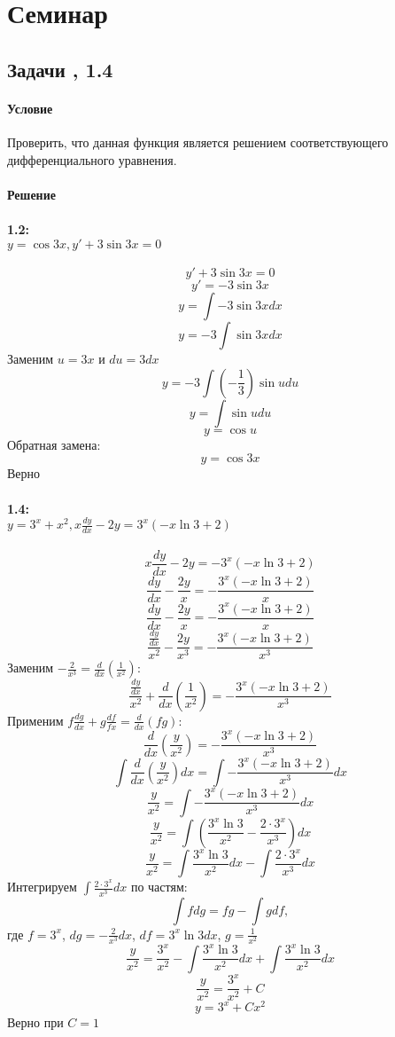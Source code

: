 \section{Семинар}
\subsection{Задачи , 1.4}
\paragraph{Условие}
Проверить, что данная функция является решением соответствующего дифференциального уравнения.
\paragraph{Решение}
\paragraph{1.2:\\ $y = \cos{3x}, y' + 3 \sin{3x} = 0$}
\[y' + 3 \sin{3x} = 0\]
\[y' = -3 \sin{3x}\]
\[y = \int -3 \sin{3x} dx\]
\[y = -3 \int \sin{3x} dx\]
Заменим $u = 3x$ и $du = 3dx$
\[y = -3 \int (-\frac{1}{3}) \sin{u} du\]
\[y = \int \sin{u} du\]
\[y = \cos{u}\]
Обратная замена:
\[y = \cos{3x}\]
Верно

\paragraph{1.4:\\ $y = 3^x + x^2, x\frac{dy}{dx} - 2y = 3^x(-x \ln 3 + 2)$}
\[x\frac{dy}{dx} - 2y = - 3^x(-x \ln 3 + 2)\]
\[\frac{dy}{dx} - \frac{2y}{x} = - \frac{3^x(-x \ln 3 + 2)}{x}\]
\[\frac{dy}{dx} - \frac{2y}{x} = - \frac{3^x(-x \ln 3 + 2)}{x}\]
\[\frac{\frac{dy}{dx}}{x^2} - \frac{2y}{x^3} = - \frac{3^x(-x \ln 3 + 2)}{x^3}\]
Заменим $-\frac{2}{x^3} = \frac{d}{dx} \left( \frac{1}{x^2} \right)$:
\[\frac{\frac{dy}{dx}}{x^2} + \frac{d}{dx} \left( \frac{1}{x^2} \right) = - \frac{3^x(-x \ln 3 + 2)}{x^3}\]
Применим $f\frac{dg}{dx} + g\frac{df}{fx} = \frac{d}{dx}(fg)$:
\[\frac{d}{dx}\left(\frac{y}{x^2}\right) = - \frac{3^x(-x \ln 3 + 2)}{x^3}\]
\[\int\frac{d}{dx}\left(\frac{y}{x^2}\right)dx = \int-\frac{3^x(-x \ln 3 + 2)}{x^3}dx\]
\[\frac{y}{x^2} = \int-\frac{3^x(-x \ln 3 + 2)}{x^3}dx\]
\[\frac{y}{x^2} = \int \left(\frac{3^x \ln 3}{x^2} - \frac{2 \cdot 3^x}{x^3}\right)dx\]
\[\frac{y}{x^2} = \int \frac{3^x \ln 3}{x^2}dx - \int \frac{2 \cdot 3^x}{x^3}dx\]
Интегрируем $\int\frac{2 \cdot 3^x}{x^3}dx$ по частям:
\[\int fdg = fg - \int gdf,\]
где $f = 3^x$, $dg = -\frac{2}{x^3}dx$, $df = 3^x \ln{3}dx$, $g = \frac{1}{x^2}$
\[\frac{y}{x^2} = \frac{3^x}{x^2} - \int \frac{3^x \ln 3}{x^2}dx + \int \frac{3^x \ln 3}{x^2}dx\]
\[\frac{y}{x^2} = \frac{3^x}{x^2} + C\]
\[y = 3^x + Cx^2\]
Верно при $C = 1$

